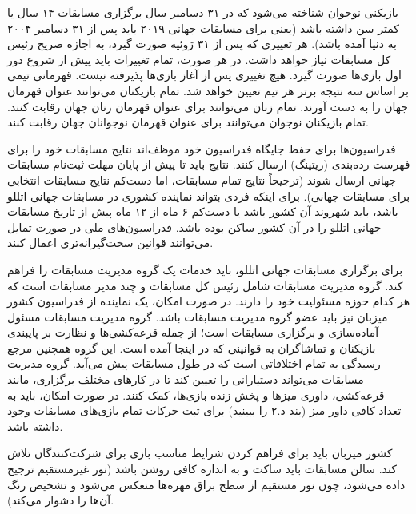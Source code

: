بازیکنی نوجوان شناخته می‌شود که در ۳۱ دسامبر سال برگزاری مسابقات ۱۴ سال یا کمتر سن داشته باشد (یعنی برای مسابقات جهانی ۲۰۱۹ باید پس از ۳۱ دسامبر ۲۰۰۴ به دنیا آمده باشد). هر تغییری که پس از ۳۱ ژوئیه صورت گیرد، به اجازه صریح رئیس کل مسابقات نیاز خواهد داشت. در هر صورت، تمام تغییرات باید پیش از شروع دور اول بازی‌ها صورت گیرد. هیچ تغییری پس از آغاز بازی‌ها پذیرفته نیست. قهرمانی تیمی بر اساس سه نتیجه برتر هر تیم تعیین خواهد شد. تمام بازیکنان می‌توانند عنوان قهرمان جهان را به دست آورند. تمام زنان می‌توانند برای عنوان قهرمان زنان جهان رقابت کنند. تمام بازیکنان نوجوان می‌توانند برای عنوان قهرمان نوجوانان جهان رقابت کنند.


فدراسیون‌ها برای حفظ جایگاه فدراسیون خود موظف‌اند نتایج مسابقات خود را برای فهرست رده‌بندی (ریتینگ)  ارسال کنند. نتایج باید تا پیش از پایان مهلت ثبت‌نام مسابقات جهانی ارسال شوند (ترجیحاً نتایج تمام مسابقات، اما دست‌کم نتایج مسابقات انتخابی برای مسابقات جهانی). برای اینکه فردی بتواند نماینده کشوری در مسابقات جهانی اتللو باشد، باید شهروند آن کشور باشد یا دست‌کم ۶ ماه از ۱۲ ماه پیش از تاریخ مسابقات جهانی اتللو را در آن کشور ساکن بوده باشد. فدراسیون‌های ملی در صورت تمایل می‌توانند قوانین سخت‌گیرانه‌تری اعمال کنند.


برای برگزاری مسابقات جهانی اتللو،  باید خدمات یک گروه مدیریت مسابقات را فراهم کند. گروه مدیریت مسابقات شامل رئیس کل مسابقات و چند مدیر مسابقات است که هر کدام حوزه مسئولیت خود را دارند. در صورت امکان، یک نماینده از فدراسیون کشور میزبان نیز باید عضو گروه مدیریت مسابقات باشد. گروه مدیریت مسابقات مسئول آماده‌سازی و برگزاری مسابقات است؛ از جمله قرعه‌کشی‌ها و نظارت بر پایبندی بازیکنان و تماشاگران به قوانینی که در اینجا آمده است. این گروه همچنین مرجع رسیدگی به تمام اختلافاتی است که در طول مسابقات پیش می‌آید. گروه مدیریت مسابقات می‌تواند دستیارانی را تعیین کند تا در کارهای مختلف برگزاری، مانند قرعه‌کشی، داوری میزها و پخش زنده بازی‌ها، کمک کنند. در صورت امکان، باید به تعداد کافی داور میز (بند د.۲ را ببینید) برای ثبت حرکات تمام بازی‌های مسابقات وجود داشته باشد.



کشور میزبان باید برای فراهم کردن شرایط مناسب بازی برای شرکت‌کنندگان تلاش کند. سالن مسابقات باید ساکت و به اندازه کافی روشن باشد (نور غیرمستقیم ترجیح داده می‌شود، چون نور مستقیم از سطح براق مهره‌ها منعکس می‌شود و تشخیص رنگ آن‌ها را دشوار می‌کند).


